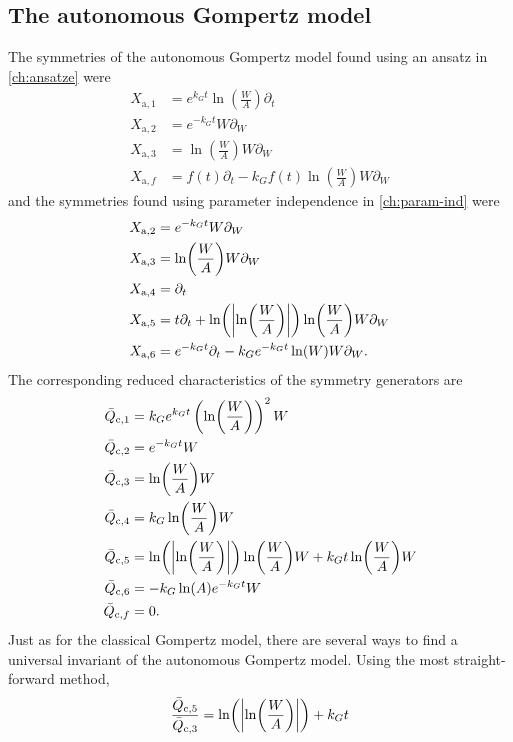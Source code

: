\subsection{The autonomous Gompertz model}

The symmetries of the autonomous Gompertz model found using an ansatz in \cref{ch:ansatze} were
\begin{align}
  X_{\text{a},1} &= e^{k_G t} \ln(\frac{W}{A}) \partial_t \\
  X_{\text{a},2} &= e^{-k_G t} W \partial_W \\
  X_{\text{a},3} &= \ln(\frac{W}{A}) W \partial_W \\
  X_{\text{a},f} &= f(t) \partial_t - k_G f(t) \ln(\frac{W}{A}) W \partial_W
\end{align}
and the symmetries found using parameter independence in \cref{ch:param-ind} were
\begin{align}
  X_{\text{a},2} &= e^{-k_G t} W \partial_W \\
  X_{\text{a},3} &= \ln(\frac{W}{A}) W \partial_W \\
  X_{\text{a},4} &= \partial_t \\
  X_{\text{a},5} &= t \partial_t + \ln(\abs{\ln(\frac{W}{A})}) \ln(\frac{W}{A}) W \partial_W \\
  X_{\text{a},6} &= e^{-k_G t} \partial_t - k_G e^{-k_G t} \ln(W) W \partial_W.
\end{align}
The corresponding reduced characteristics of the symmetry generators are
\begin{align}
  \bar{Q}_{\text{c},1} &= k_G e^{k_G t} \left(\ln(\frac{W}{A})\right)^2 W \\
  \bar{Q}_{\text{c},2} &= e^{-k_G t} W \\
  \bar{Q}_{\text{c},3} &= \ln(\frac{W}{A}) W\\
  \bar{Q}_{\text{c},4} &= k_G \ln(\frac{W}{A}) W \\
  \bar{Q}_{\text{c},5} &= \ln(\abs{\ln(\frac{W}{A})}) \ln(\frac{W}{A}) W + k_G t \ln(\frac{W}{A}) W \\
  \bar{Q}_{\text{c},6} &= - k_G \ln(A) e^{-k_G t} W \\
  \bar{Q}_{\text{c},f} &= 0.
\end{align}
Just as for the classical Gompertz model, there are several ways to find a universal invariant of the autonomous Gompertz model.
Using the most straight-forward method,
\begin{equation}
  \frac{\bar{Q}_{\text{c},5}}{\bar{Q}_{\text{c},3}} = \ln(\abs{\ln(\frac{W}{A})}) + k_G t
\end{equation}
